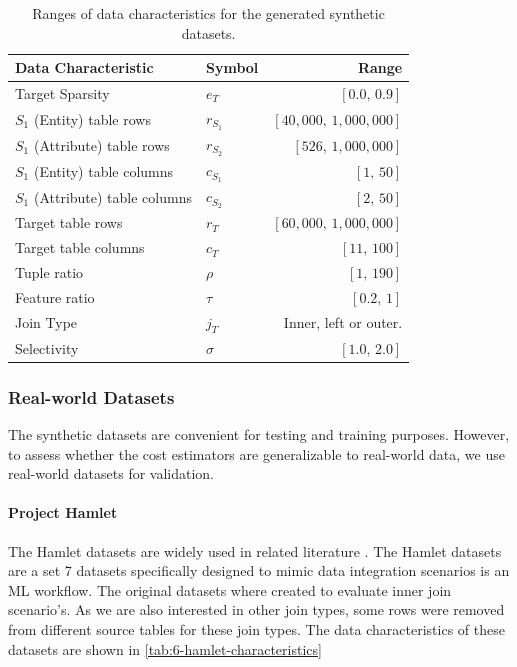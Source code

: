\begin{table}[ht]
  \centering
  \begin{tabular}{llr}
    \toprule
    Data Characteristic             & Symbol    & Range                              \\ \midrule \midrule
    Target Sparsity                 & $e_T$     & $[ 0.0\text{,\ \ } 0.9]$           \\
    $S_1$ (Entity) table rows       & $r_{S_1}$ & $[ 40,000\text{,\ \ } 1,000,000]$  \\
    $S_1$ (Attribute) table rows    & $r_{S_2}$ & $[ 526\text{,\ \ } 1,000,000]$     \\
    $S_1$ (Entity) table columns    & $c_{S_1}$ & $[ 1\text{,\ \ } 50]$              \\
    $S_1$ (Attribute) table columns & $c_{S_2}$ & $[ 2\text{,\ \ } 50]$              \\
    Target table rows               & $r_T$     & $[ 60,000 \text{,\ \ } 1,000,000]$ \\
    Target table columns            & $c_T$     & $[ 11\text{,\ \ } 100]$            \\
    Tuple ratio                     & $\rho$    & $[ 1\text{,\ \ } 190]$             \\
    Feature ratio                   & $\tau$    & $[ 0.2\text{,\ \ } 1]$             \\
    Join Type                       & $j_T$     & Inner, left or outer.              \\
    Selectivity                     & $\sigma$  & $[ 1.0\text{,\ \ } 2.0]$           \\
    \bottomrule
  \end{tabular}
  \caption{Ranges of data characteristics for the generated synthetic datasets.}
  \label{tab:6-synthetic-dataset-characteristics}
\end{table}


\subsubsection{Real-world Datasets}
The synthetic datasets are convenient for testing and training purposes. However, to assess whether the cost estimators are generalizable to real-world data, we use real-world datasets for validation.

\paragraph{Project Hamlet \cite{2016-hamlet-sigmod}}
The Hamlet datasets are widely used in related literature \cite{2016-hamlet-sigmod, amalur, morpheus,orion_learning_gen_lin_models}. The Hamlet datasets are a set 7 datasets specifically designed to mimic data integration scenarios is an ML workflow. The original datasets where created to evaluate inner join scenario's. As we are also interested in other join types, some rows were removed from different source tables for these join types. The data characteristics of these datasets are shown in \autoref{tab:6-hamlet-characteristics}


